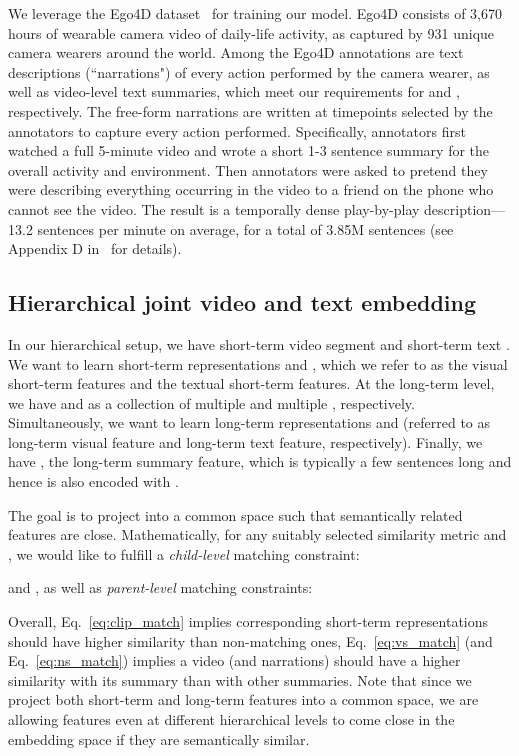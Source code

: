 \documentclass[10pt,twocolumn,letterpaper]{article}
\begin{document}
We leverage the Ego4D dataset~\cite{ego4d,ego4dcons} for training our model.  Ego4D consists of 3,670 hours of wearable camera video of daily-life activity, as captured by 931 unique camera wearers around the world.  Among the Ego4D annotations are text descriptions (``narrations") of every action performed by the camera wearer, as well as video-level text summaries, which meet our requirements for  and , respectively.  The free-form narrations are written at timepoints selected by the annotators to capture every action performed.  Specifically, annotators first watched a full 5-minute video and wrote a short 1-3 sentence summary for the overall activity and environment. 
Then annotators were asked to pretend they were describing everything occurring in the video to a friend on the phone who cannot see the video.  The result is a temporally dense play-by-play description---13.2 sentences per minute on average, for a total of 3.85M sentences (see Appendix D in~\cite{ego4d} for details).

\subsection{Hierarchical joint video and text embedding}
\label{sec:joint-video-text}


In our hierarchical setup, we have short-term video segment  and short-term text .
We want to learn short-term representations  and , which we refer to as the visual short-term features and the textual short-term features. At the long-term level, we have  and  as a collection of multiple  and multiple , respectively. Simultaneously, we want to learn long-term representations  and  (referred to as long-term visual feature and long-term text feature, respectively). Finally, we have , the long-term summary feature, which is typically a few sentences long and hence is also encoded with . 

The goal is to project  into a common space 
such that semantically related features are close. Mathematically, for any suitably selected similarity metric  and , we would like to fulfill a {\em child-level} matching constraint: 

and , as well as {\em parent-level} matching constraints:

Overall, Eq.~\ref{eq:clip_match} implies corresponding short-term representations should have higher similarity than non-matching ones, Eq.~\ref{eq:vs_match} (and Eq.~\ref{eq:ns_match}) implies a video (and narrations) should have a higher similarity with its summary than with other summaries. Note that since we project both short-term and long-term features into a common space, we are allowing features even at different hierarchical levels to come close in the embedding space if they are semantically similar.
\end{document}
